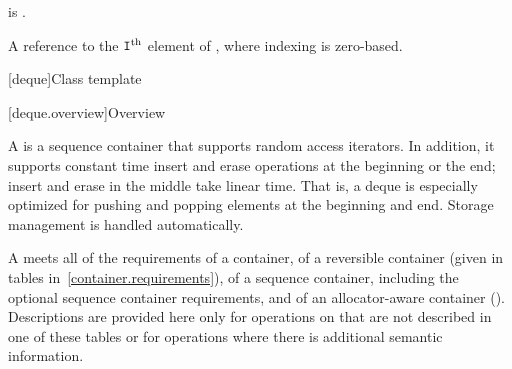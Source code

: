 \begin{itemdescr}
\pnum
\mandates
{} is .

\pnum
\returns
A reference to the $\texttt{I}^\text{th}$ element of ,
where indexing is zero-based.
\end{itemdescr}

[deque]{Class template }

[deque.overview]{Overview}

\pnum
A
%
is a sequence container that supports random access iterators.
In addition, it supports constant time insert and erase operations at the beginning or the end;
insert and erase in the middle take linear time.
That is, a deque is especially optimized for pushing and popping elements at the beginning and end.
Storage management is handled automatically.

\pnum
A
meets all of the requirements of a container, of a reversible container
(given in tables in~\ref{container.requirements}), of a sequence container,
including the optional sequence container requirements, and of an allocator-aware container ().
Descriptions are provided here only for operations on
that are not described in one of these tables
or for operations where there is additional semantic information.

